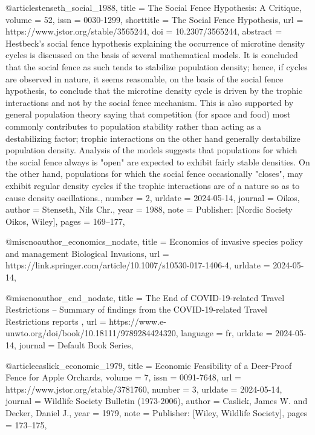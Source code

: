 {{{{@article{stenseth_social_1988,
	title = {The {Social} {Fence} {Hypothesis}: {A} {Critique}},
	volume = {52},
	issn = {0030-1299},
	shorttitle = {The {Social} {Fence} {Hypothesis}},
	url = {https://www.jstor.org/stable/3565244},
	doi = {10.2307/3565244},
	abstract = {Hestbeck's social fence hypothesis explaining the occurrence of microtine density cycles is discussed on the basis of several mathematical models. It is concluded that the social fence as such tends to stabilize population density; hence, if cycles are observed in nature, it seems reasonable, on the basis of the social fence hypothesis, to conclude that the microtine density cycle is driven by the trophic interactions and not by the social fence mechanism. This is also supported by general population theory saying that competition (for space and food) most commonly contributes to population stability rather than acting as a destabilizing factor; trophic interactions on the other hand generally destabilize population density. Analysis of the models suggests that populations for which the social fence always is "open" are expected to exhibit fairly stable densities. On the other hand, populations for which the social fence occasionally "closes", may exhibit regular density cycles if the trophic interactions are of a nature so as to cause density oscillations.},
	number = {2},
	urldate = {2024-05-14},
	journal = {Oikos},
	author = {Stenseth, Nils Chr.},
	year = {1988},
	note = {Publisher: [Nordic Society Oikos, Wiley]},
	pages = {169--177},
}

@misc{noauthor_economics_nodate,
	title = {Economics of invasive species policy and management {\textbar} {Biological} {Invasions}},
	url = {https://link.springer.com/article/10.1007/s10530-017-1406-4},
	urldate = {2024-05-14},
}

@misc{noauthor_end_nodate,
	title = {The {End} of {COVID}-19-related {Travel} {Restrictions} – {Summary} of findings from the {COVID}-19-related {Travel} {Restrictions} reports {\textbar}},
	url = {https://www.e-unwto.org/doi/book/10.18111/9789284424320},
	language = {fr},
	urldate = {2024-05-14},
	journal = {Default Book Series},
}

@article{caslick_economic_1979,
	title = {Economic {Feasibility} of a {Deer}-{Proof} {Fence} for {Apple} {Orchards}},
	volume = {7},
	issn = {0091-7648},
	url = {https://www.jstor.org/stable/3781760},
	number = {3},
	urldate = {2024-05-14},
	journal = {Wildlife Society Bulletin (1973-2006)},
	author = {Caslick, James W. and Decker, Daniel J.},
	year = {1979},
	note = {Publisher: [Wiley, Wildlife Society]},
	pages = {173--175},
}

}}}}
